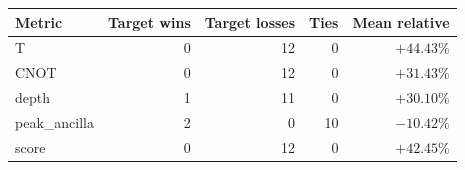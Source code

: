 \begin{tabular}{lrrrr}
\toprule
Metric & Target wins & Target losses & Ties & Mean relative \\
\midrule
T & 0 & 12 & 0 & $+44.43\%$ \\
CNOT & 0 & 12 & 0 & $+31.43\%$ \\
depth & 1 & 11 & 0 & $+30.10\%$ \\
peak_ancilla & 2 & 0 & 10 & $-10.42\%$ \\
score & 0 & 12 & 0 & $+42.45\%$ \\
\bottomrule
\end{tabular}
